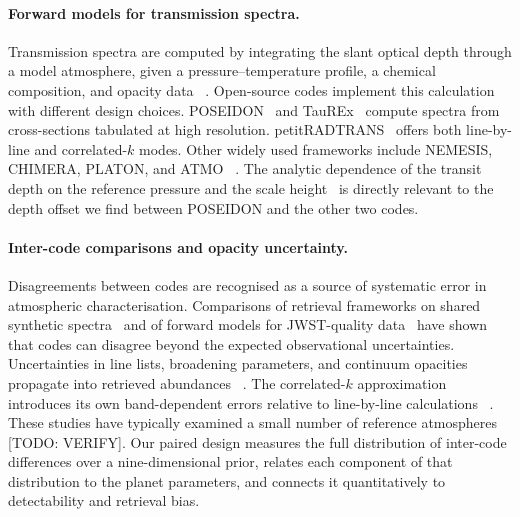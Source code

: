 \paragraph{Forward models for transmission spectra.}
Transmission spectra are computed by integrating the slant optical depth through a model atmosphere, given a pressure--temperature profile, a chemical composition, and opacity data~\cite{TODO_brown_2001_transmission_model,TODO_benneke_seager_transmission_scaleheight}%
.
Open-source codes implement this calculation with different design choices.
POSEIDON~\cite{TODO_macdonald_poseidon} and TauREx~\cite{TODO_alrefaie_taurex3} compute spectra from cross-sections tabulated at high resolution.
petitRADTRANS~\cite{TODO_molliere_petitradtrans} offers both line-by-line and correlated-$k$ modes.
Other widely used frameworks include NEMESIS, CHIMERA, PLATON, and ATMO~\cite{TODO_other_forward_model_codes}%
.
The analytic dependence of the transit depth on the reference pressure and the scale height~\cite{TODO_heng_kitzmann_2017_reference_pressure}%
is directly relevant to the depth offset we find between POSEIDON and the other two codes.

\paragraph{Inter-code comparisons and opacity uncertainty.}
Disagreements between codes are recognised as a source of systematic error in atmospheric characterisation.
Comparisons of retrieval frameworks on shared synthetic spectra~\cite{TODO_barstow_2020_retrieval_comparison} and of forward models for JWST-quality data~\cite{TODO_baudino_2017_model_comparison} have shown that codes can disagree beyond the expected observational uncertainties.
Uncertainties in line lists, broadening parameters, and continuum opacities propagate into retrieved abundances~\cite{TODO_niraula_2022_opacity_challenge}%
.
The correlated-$k$ approximation introduces its own band-dependent errors relative to line-by-line calculations~\cite{TODO_lacis_oinas_1991_correlated_k,TODO_correlated_k_vs_line_by_line_accuracy}%
.
These studies have typically examined a small number of reference atmospheres [TODO: VERIFY].
Our paired design measures the full distribution of inter-code differences over a nine-dimensional prior, relates each component of that distribution to the planet parameters, and connects it quantitatively to detectability and retrieval bias.

